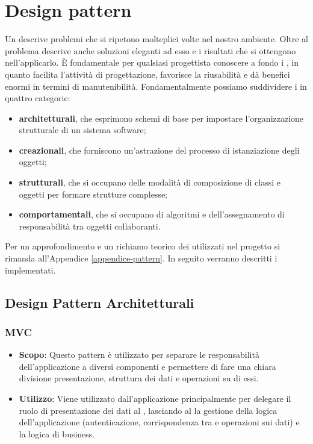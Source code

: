 \section{Design pattern}

Un  descrive problemi che si ripetono molteplici volte nel nostro ambiente. Oltre al problema descrive anche soluzioni eleganti ad esso e i risultati che si ottengono nell'applicarlo. È fondamentale per qualsiasi progettista conoscere a fondo i , in quanto facilita l'attività di progettazione, favorisce la riusabilità e dà benefici enormi in termini di manutenibilità. Fondamentalmente possiamo suddividere i  in quattro categorie:

\begin{itemize}

	\item \textbf{ architetturali}, che esprimono schemi di base per impostare l'organizzazione strutturale di un sistema software;
	\item \textbf{ creazionali}, che forniscono un'astrazione del processo di istanziazione degli oggetti;
	\item \textbf{ strutturali}, che si occupano delle modalità di composizione di classi e oggetti per formare strutture complesse; 
	\item \textbf{ comportamentali}, che si occupano di algoritmi e dell'assegnamento di responsabilità tra oggetti collaboranti.

\end{itemize}

Per un approfondimento e un richiamo teorico dei  utilizzati nel progetto  si rimanda all'Appendice \ref{appendice-pattern}. In seguito verranno descritti i  implementati.

\subsection{Design Pattern Architetturali}

\subsubsection{MVC}

\begin{itemize}

	\item \textbf{Scopo}: Questo pattern è utilizzato per separare le responsabilità dell'applicazione a diversi componenti e permettere di fare una chiara divisione presentazione, struttura dei dati e operazioni su di essi.
	\item \textbf{Utilizzo}: Viene utilizzato dall'applicazione principalmente per delegare il ruolo di presentazione dei dati al , lasciando al  la gestione della logica dell'applicazione (autenticazione, corrispondenza tra  e operazioni sui dati) e la logica di business.
	
\end{itemize}

